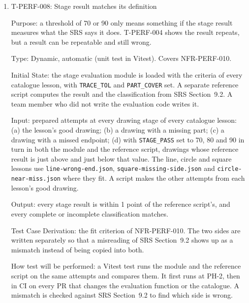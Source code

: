 \documentclass[12pt, titlepage]{article}
\newcommand{\testitem}[1]{\item #1\par\nopagebreak}
\begin{document}
\begin{enumerate}
Output: every checklist item works on every combination. Any combination
that fails is removed from \texttt{SUPPORTED\_DEVICES}, and OI-09 is
updated.

Test Case Derivation: the fit criterion of NFR-PERF-009.

How test will be performed: a team member runs the checklist by hand at
each milestone. Running it at the two earlier milestones, not only at the
final demo, means a browser update that breaks a feature is found while there
is still time to fix it. The results are kept as a table of device by feature
in the VnV Report.

\testitem{T-PERF-008: Stage result matches its definition}

Purpose: a threshold of 70 or 90 only means something if the stage result
measures what the SRS says it does. T-PERF-004 shows the result repeats, but a
result can be repeatable and still wrong.

Type: Dynamic, automatic (unit test in Vitest). Covers NFR-PERF-010.

Initial State: the stage evaluation module is loaded with the criteria of
every catalogue lesson, with \texttt{TRACE\_TOL} and \texttt{PART\_COVER}
set. A separate reference script computes the result and the classification
from SRS Section~9.2. A team member who did not write the evaluation code
writes it.

Input: prepared attempts at every drawing stage of every catalogue lesson:
(a) the lesson's good drawing; (b) a drawing with a missing part;
(c) a drawing with a missed endpoint; (d) with \texttt{STAGE\_PASS} set to 70, 80 and 90 in turn in both the module and
the reference script, drawings whose reference result is just above and just
below that value. The line, circle and square lessons
use \texttt{line-\allowbreak{}wrong-\allowbreak{}end.json},
\texttt{square-\allowbreak{}missing-\allowbreak{}side.json} and
\texttt{circle-\allowbreak{}near-\allowbreak{}miss.json} where they fit. A
script makes the other attempts from each lesson's good drawing.

Output: every stage result is within 1 point of the reference script's, and
every complete or incomplete classification matches.

Test Case Derivation: the fit criterion of NFR-PERF-010. The two sides are
written separately so that a misreading of SRS Section~9.2 shows up as a
mismatch instead of being copied into both.

How test will be performed: a Vitest test runs the module and the reference
script on the same attempts and compares them. It first runs at PH-2, then in
CI on every PR that changes the evaluation function or the catalogue. A
mismatch is checked against SRS Section~9.2 to find which side is wrong.

\end{enumerate}
\end{document}
